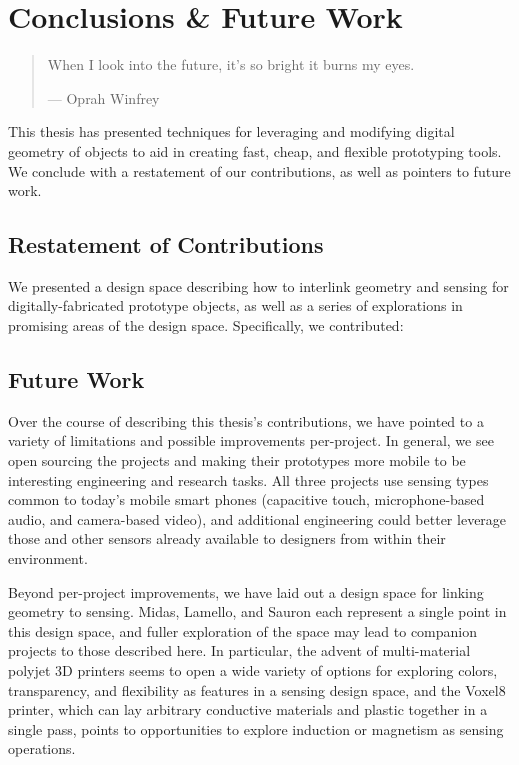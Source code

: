 \chapter{Conclusions \& Future Work}

\begin{quote}
When I look into the future, it's so bright it burns my eyes.

--- Oprah Winfrey
\end{quote}

This thesis has presented techniques for leveraging and modifying digital geometry of objects to aid in creating fast, cheap, and flexible prototyping tools. We conclude with a restatement of our contributions, as well as pointers to future work.

\section{Restatement of Contributions}

We presented a design space describing how to interlink geometry and sensing for digitally-fabricated prototype objects, as well as a series of explorations in promising areas of the design space. Specifically, we contributed:



\section{Future Work}

Over the course of describing this thesis's contributions, we have pointed to a variety of limitations and possible improvements per-project. In general, we see open sourcing the projects and making their prototypes more mobile to be interesting engineering and research tasks. All three projects use sensing types common to today's mobile smart phones (capacitive touch, microphone-based audio, and camera-based video), and additional engineering could better leverage those and other sensors already available to designers from within their environment.

Beyond per-project improvements, we have laid out a design space for linking geometry to sensing. Midas, Lamello, and Sauron each represent a single point in this design space, and fuller exploration of the space may lead to companion projects to those described here. In particular, the advent of multi-material polyjet 3D printers seems to open a wide variety of options for exploring colors, transparency, and flexibility as features in a sensing design space, and the Voxel8 \cite{voxel8} printer, which can lay arbitrary conductive materials and plastic together in a single pass, points to opportunities to explore induction or magnetism as sensing operations.

